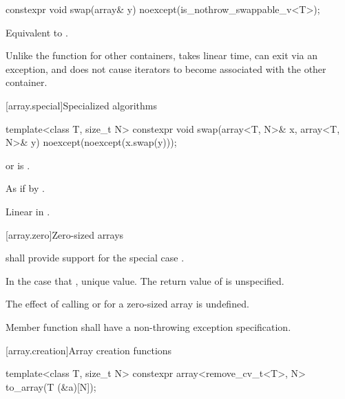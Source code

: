 %
\begin{itemdecl}
constexpr void swap(array& y) noexcept(is_nothrow_swappable_v<T>);
\end{itemdecl}

\begin{itemdescr}
\pnum
\effects
Equivalent to .

\pnum
\begin{note}
Unlike the  function for other containers, 
takes linear time, can exit via an exception, and does not cause iterators to
become associated with the other container.
\end{note}
\end{itemdescr}

[array.special]{Specialized algorithms}

%
\begin{itemdecl}
template<class T, size_t N>
  constexpr void swap(array<T, N>& x, array<T, N>& y) noexcept(noexcept(x.swap(y)));
\end{itemdecl}

\begin{itemdescr}
\pnum
\constraints
{} or  is .

\pnum
\effects
As if by .

\pnum
\complexity
Linear in .
\end{itemdescr}

[array.zero]{Zero-sized arrays}

%
\pnum
{} shall provide support for the special case .

\pnum
In the case that ,  unique value.
The return value of  is unspecified.

\pnum
The effect of calling  or  for a zero-sized array is
undefined.

\pnum
Member function  shall have a
non-throwing exception specification.

[array.creation]{Array creation functions}
%

%
\begin{itemdecl}
template<class T, size_t N>
  constexpr array<remove_cv_t<T>, N> to_array(T (&a)[N]);
\end{itemdecl}

